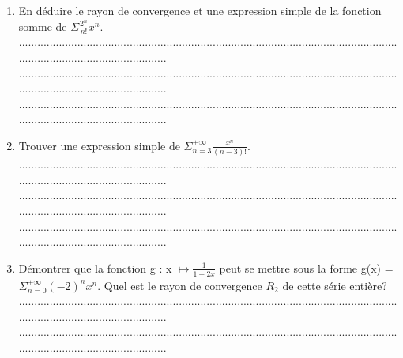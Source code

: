 \documentclass{article}
\begin{document}
\begin{footnotesize}
\begin{enumerate}
    \item En déduire le rayon de convergence et une expression simple de la fonction somme de $\Sigma \frac{2^{n}}{n!}x^{n}$.\newline\newline
        ...........................................................................................................................................................................\newline
        ...........................................................................................................................................................................\newline
        ...........................................................................................................................................................................\newline\newline
    \item Trouver une expression simple de $\Sigma_{n=3}^{+\infty} \frac{x^{n}}{(n-3)!}$.\newline\newline
    ...........................................................................................................................................................................\newline
    ...........................................................................................................................................................................\newline
    ...........................................................................................................................................................................\newline\newline
    \item Démontrer que la fonction g : x $\mapsto \frac{1}{1+2x}$ peut se mettre sous la forme g(x) = $\Sigma_{n=0}^{+\infty} (-2)^{n} x^{n}$.\newline
    Quel est le rayon de convergence $R_{2}$ de cette série entière?\newline\newline
    ...........................................................................................................................................................................\newline
    ...........................................................................................................................................................................\newline

\end{enumerate}
\end{footnotesize}
\end{document}
